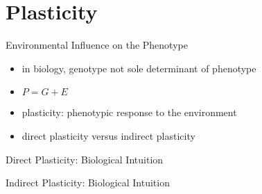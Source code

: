 \section{Plasticity}

\begin{frame}{Environmental Influence on the Phenotype}
\begin{itemize}
	\item in biology, genotype not sole determinant of phenotype
    \item $P = G + E$
    \item plasticity: phenotypic response to the environment
    \item direct plasticity versus indirect plasticity
\end{itemize}
\end{frame}

\begin{frame}{Direct Plasticity: Biological Intuition}
  
\end{frame}

\begin{frame}{Indirect Plasticity: Biological Intuition}
  
\end{frame}
